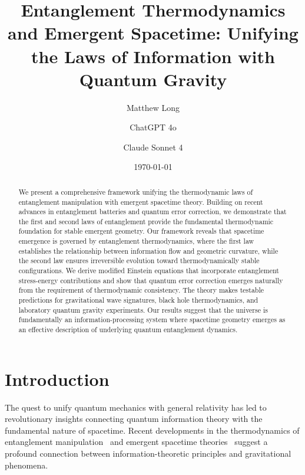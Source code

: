 \documentclass[twocolumn,showpacs,preprintnumbers,amsmath,amssymb,aps]{revtex4-1}
\begin{document}
\title{Entanglement Thermodynamics and Emergent Spacetime: Unifying the Laws of Information with Quantum Gravity}

\author{Matthew Long}

\author{ChatGPT 4o}

\author{Claude Sonnet 4}

\date{\today}

\begin{abstract}
We present a comprehensive framework unifying the thermodynamic laws of entanglement manipulation with emergent spacetime theory. Building on recent advances in entanglement batteries and quantum error correction, we demonstrate that the first and second laws of entanglement provide the fundamental thermodynamic foundation for stable emergent geometry. Our framework reveals that spacetime emergence is governed by entanglement thermodynamics, where the first law establishes the relationship between information flow and geometric curvature, while the second law ensures irreversible evolution toward thermodynamically stable configurations. We derive modified Einstein equations that incorporate entanglement stress-energy contributions and show that quantum error correction emerges naturally from the requirement of thermodynamic consistency. The theory makes testable predictions for gravitational wave signatures, black hole thermodynamics, and laboratory quantum gravity experiments. Our results suggest that the universe is fundamentally an information-processing system where spacetime geometry emerges as an effective description of underlying quantum entanglement dynamics.
\end{abstract}


\maketitle

\section{Introduction}

The quest to unify quantum mechanics with general relativity has led to revolutionary insights connecting quantum information theory with the fundamental nature of spacetime. Recent developments in the thermodynamics of entanglement manipulation~\cite{ganardi2025second} and emergent spacetime theories~\cite{vanraamsdonk2010,swingle2012} suggest a profound connection between information-theoretic principles and gravitational phenomena.
\end{document}
